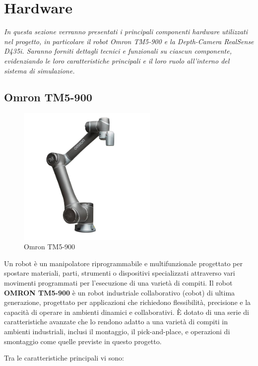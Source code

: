 \documentclass[11pt]{report}
\begin{document}
\section{Hardware}
\textit{In questa sezione verranno presentati i principali componenti hardware utilizzati nel progetto, in particolare il robot Omron TM5-900 e la Depth-Camera RealSense D435i. Saranno forniti dettagli tecnici e funzionali su ciascun componente, evidenziando le loro caratteristiche principali e il loro ruolo all'interno del sistema di simulazione.}

\subsection{Omron TM5-900}
\begin{figure}[h!]
    \centering
    \includegraphics[width=0.6\textwidth]{images/omron.png}
    \caption{Omron TM5-900}
    \label{fig:omron}
\end{figure}

Un robot è un manipolatore riprogrammabile e multifunzionale progettato per spostare materiali, parti, strumenti o dispositivi specializzati attraverso vari movimenti programmati per l'esecuzione di una varietà di compiti. Il robot \textbf{OMRON TM5-900} è un robot industriale collaborativo (cobot) di ultima generazione, progettato per applicazioni che richiedono flessibilità, precisione e la capacità di operare in ambienti dinamici e collaborativi. È dotato di una serie di caratteristiche avanzate che lo rendono adatto a una varietà di compiti in ambienti industriali, inclusi il montaggio, il pick-and-place, e operazioni di smontaggio come quelle previste in questo progetto.

Tra le caratteristiche principali vi sono:
\end{document}
